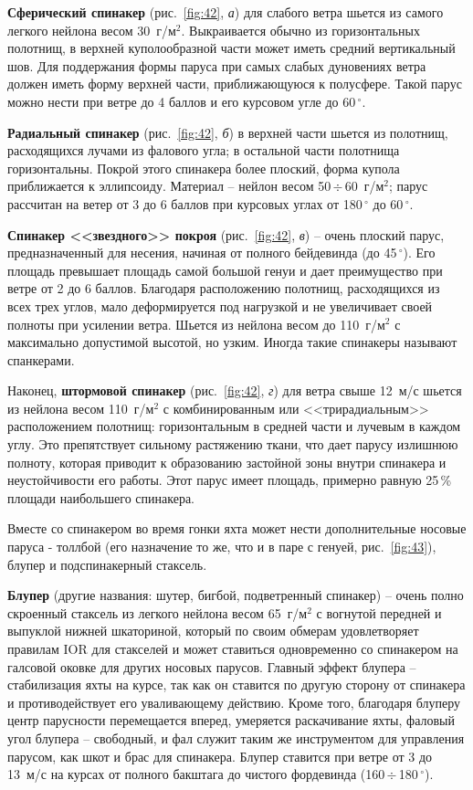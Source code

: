 \documentclass[a4paper, 12pt, twoside, final, book, russian, fittopage, cyremdash]{ncc}
\newcommand{\gr}{\ensuremath{\,^\circ}\xspace}
\newcommand{\otdo}{\,\ensuremath{\div}\,}
\newcommand{\ris}[1]{\ref{fig:#1}}
\newcommand{\gmsq}{~г/м$^2$\xspace}
\begin{document}
\textbf{Сферический спинакер} (рис.~\ris{42}, \textit{а}) для слабого ветра шьется из самого легкого нейлона весом 30\gmsq. Выкраивается обычно из горизонтальных полотнищ, в верхней куполообразной части может иметь средний вертикальный шов. Для поддержания формы паруса при самых слабых дуновениях ветра должен иметь форму верхней части, приближающуюся к полусфере. Такой парус можно нести при ветре до 4 баллов и его курсовом угле до 60\gr.

\textbf{Радиальный спинакер} (рис.~\ris{42}, \textit{б}) в верхней части шьется из полотнищ, расходящихся лучами из фалового угла; в остальной части полотнища горизонтальны. Покрой этого спинакера более плоский, форма купола приближается к эллипсоиду. Материал \--- нейлон весом 50\otdo 60\gmsq; парус рассчитан на ветер от 3 до 6 баллов при курсовых углах от 180\gr до 60\gr. 

\textbf{Спинакер <<звездного>> покроя} (рис.~\ris{42}, \textit{в}) \--- очень плоский парус, предназначенный для несения, начиная от полного бейдевинда (до 45\gr). Его площадь превышает площадь самой большой генуи и дает преимущество при ветре от 2 до 6 баллов. Благодаря расположению полотнищ, расходящихся из всех трех углов, мало деформируется под нагрузкой и не увеличивает своей полноты при усилении ветра. Шьется из нейлона весом до 110\gmsq с максимально допустимой высотой, но узким. Иногда такие спинакеры называют спанкерами. 

Наконец, \textbf{штормовой спинакер} (рис.~\ris{42}, \textit{г}) для ветра свыше 12~м/с шьется из нейлона весом 110\gmsq с комбинированным или <<трирадиальным>> расположением полотнищ: горизонтальным в средней части и лучевым в каждом углу. Это препятствует сильному растяжению ткани, что дает парусу излишнюю полноту, которая приводит к образованию застойной зоны внутри спинакера и неустойчивости его работы. Этот парус имеет площадь, примерно равную 25\,\% площади наибольшего спинакера. 

Вместе со спинакером во время гонки яхта может нести дополнительные носовые паруса - толлбой (его назначение то же, что и в паре с генуей, рис.~\ris{43}), блупер и подспинакерный стаксель. 

\textbf{Блупер} (другие названия: шутер, бигбой, подветренный спинакер) \--- очень полно скроенный стаксель из легкого нейлона весом 65\gmsq с вогнутой передней и выпуклой нижней шкаториной, который по своим обмерам удовлетворяет правилам IOR для стакселей и может ставиться одновременно со спинакером на галсовой оковке для других носовых парусов. Главный эффект блупера \--- стабилизация яхты на курсе, так как он ставится по другую сторону от спинакера и противодействует его уваливающему действию. Кроме того, благодаря блуперу центр парусности перемещается вперед, умеряется раскачивание яхты, фаловый угол блупера \--- свободный, и фал служит таким же инструментом для управления парусом, как шкот и брас для спинакера. Блупер ставится при ветре от 3 до 13~м/с на курсах от полного бакштага до чистого фордевинда (160\otdo 180\gr).
 
\end{document}
